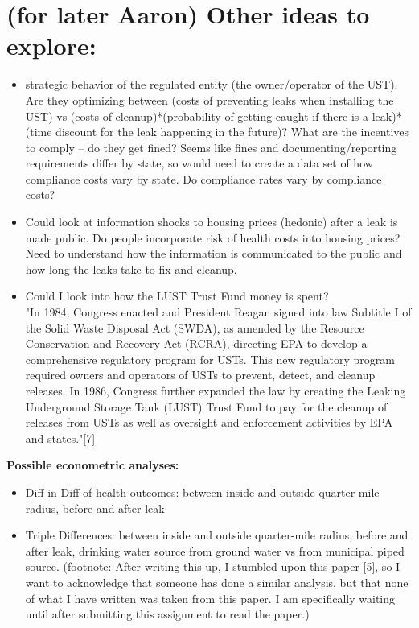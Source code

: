 \documentclass[12pt]{article}
\begin{document}
\section{(for later Aaron) Other ideas to explore:}
\begin{itemize}
    \item strategic behavior of the regulated entity (the owner/operator of the UST). Are they optimizing between (costs of preventing leaks when installing the UST) vs (costs of cleanup)*(probability of getting caught if there is a leak)*(time discount for the leak happening in the future)? What are the incentives to comply -- do they get fined? Seems like fines and documenting/reporting requirements differ by state, so would need to create a data set of how compliance costs vary by state. Do compliance rates vary by compliance costs?
    \item Could look at information shocks to housing prices (hedonic) after a leak is made public. Do people incorporate risk of health costs into housing prices? Need to understand how the information is communicated to the public and how long the leaks take to fix and cleanup.
    \item Could I look into how the LUST Trust Fund money is spent?\\
        "In 1984, Congress enacted and President
        Reagan signed into law Subtitle I of the
        Solid Waste Disposal Act (SWDA), as
        amended by the Resource Conservation and
        Recovery Act (RCRA), directing EPA to
        develop a comprehensive regulatory
        program for USTs. This new regulatory
        program required owners and operators of
        USTs to prevent, detect, and cleanup
        releases. In 1986, Congress further
        expanded the law by creating the Leaking
        Underground Storage Tank (LUST) Trust
        Fund to pay for the cleanup of releases from
        USTs as well as oversight and enforcement
        activities by EPA and states."[7]
\end{itemize}

\textbf{Possible econometric analyses:}
\begin{itemize}
    \item Diff in Diff of health outcomes: between inside and outside quarter-mile radius, before and after leak
    \item Triple Differences:  between inside and outside quarter-mile radius, before and after leak, drinking water source from ground water vs from municipal piped source. (footnote: After writing this up, I stumbled upon this paper [5], so I want to acknowledge that someone has done a similar analysis, but that none of what I have written was taken from this paper. I am specifically waiting until after submitting this assignment to read the paper.)
\end{itemize}
\end{document}
